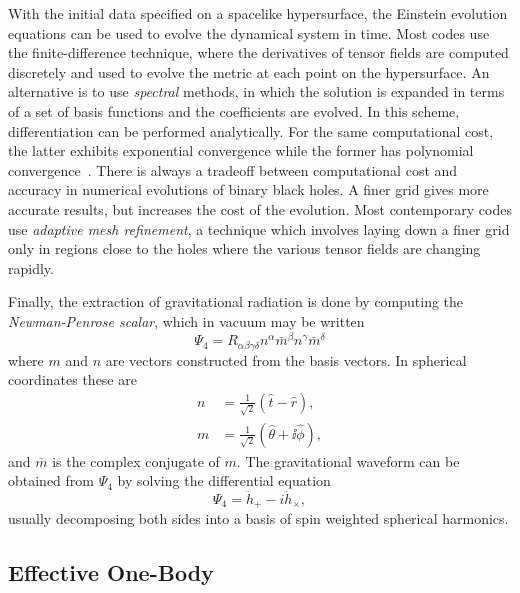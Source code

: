 With the initial data specified on a spacelike hypersurface, the Einstein 
evolution equations can be used to evolve the dynamical system in time. 
Most codes use the finite-difference technique, where the derivatives of 
tensor fields are computed discretely and used to evolve the metric at
each point on the hypersurface. An alternative is to use {\it spectral}
methods, in which the solution is expanded in terms of a set of basis functions
and the coefficients are evolved. In this scheme, differentiation can be
performed analytically. For the same computational cost, the latter exhibits
exponential convergence while the former has polynomial
convergence~\cite{Hinder:2010vn}. There is always a tradeoff between 
computational cost and accuracy in numerical evolutions of binary black holes. 
A finer grid gives more accurate results, but increases the cost of the 
evolution. Most contemporary codes use {\it adaptive mesh refinement},
a technique which involves laying down a finer grid only in regions close to the
holes where the various tensor fields are changing rapidly.


Finally, the extraction of gravitational radiation is done by computing 
the \emph{Newman-Penrose scalar}, which in vacuum may be written
%
%
\begin{equation*}
\Psi_4 = R_{\alpha \beta \gamma \delta} n^\alpha \bar{m}^\beta n^\gamma
\bar{m}^\delta
\end{equation*}
%
where $m$ and $n$ are vectors constructed from the basis vectors.
In spherical coordinates these are
%
\begin{align*}
n &= \frac{1}{\sqrt{2}} \left(\hat{t} - \hat{r}\right), \\
m &= \frac{1}{\sqrt{2}} \left(\hat{\theta} +\ii  \hat{\phi}\right),
\end{align*}
%
and $\bar{m}$ is the complex conjugate of $m$. The gravitational waveform
can be obtained from $\Psi_4$ by solving the differential equation
%
\begin{equation*}
\Psi_4 = \ddot{h}_+ - i \ddot{h}_\times,
\end{equation*}
%
usually decomposing both sides into a basis of spin weighted spherical 
harmonics.

\subsection{Effective One-Body}
\label{ssec:EOB}

